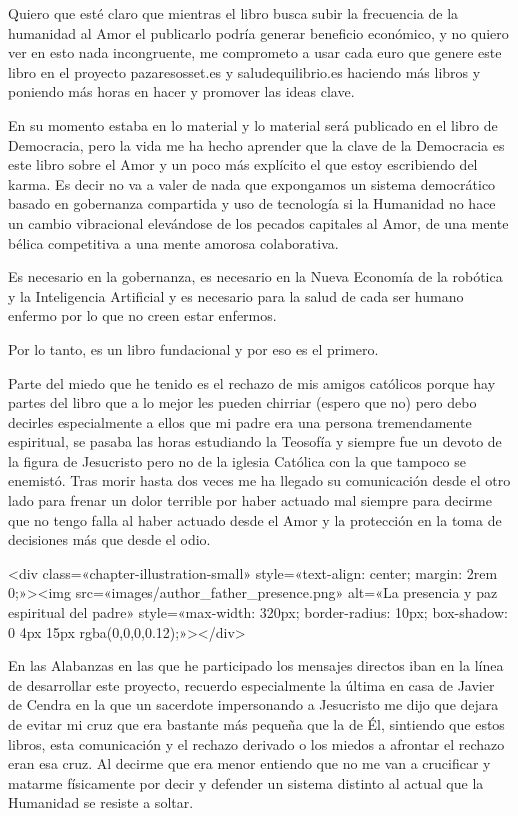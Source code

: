 \documentclass[12pt,twoside,openany]{book}
\begin{document}
Quiero que esté claro que mientras el libro busca subir la frecuencia de la humanidad al Amor el publicarlo podría generar beneficio económico, y no quiero ver en esto nada incongruente, me comprometo a usar cada euro que genere este libro en el proyecto pazaresosset.es y saludequilibrio.es haciendo más libros y poniendo más horas en hacer y promover las ideas clave.

En su momento estaba en lo material y lo material será publicado en el libro de Democracia, pero la vida me ha hecho aprender que la clave de la Democracia es este libro sobre el Amor y un poco más explícito el que estoy escribiendo del karma. Es decir no va a valer de nada que expongamos un sistema democrático basado en gobernanza compartida y uso de tecnología si la Humanidad no hace un cambio vibracional elevándose de los pecados capitales al Amor, de una mente bélica competitiva a una mente amorosa colaborativa.

Es necesario en la gobernanza, es necesario en la Nueva Economía de la robótica y la Inteligencia Artificial y es necesario para la salud de cada ser humano enfermo por lo que no creen estar enfermos.

Por lo tanto, es un libro fundacional y por eso es el primero.

Parte del miedo que he tenido es el rechazo de mis amigos católicos porque hay partes del libro que a lo mejor les pueden chirriar (espero que no) pero debo decirles especialmente a ellos que mi padre era una persona tremendamente espiritual, se pasaba las horas estudiando la Teosofía y siempre fue un devoto de la figura de Jesucristo pero no de la iglesia Católica con la que tampoco se enemistó. Tras morir hasta dos veces me ha llegado su comunicación desde el otro lado para frenar un dolor terrible por haber actuado mal siempre para decirme que no tengo falla al haber actuado desde el Amor y la protección en la toma de decisiones más que desde el odio. 

<div class=«chapter-illustration-small» style=«text-align: center; margin: 2rem 0;»><img src=«images/author_father_presence.png» alt=«La presencia y paz espiritual del padre» style=«max-width: 320px; border-radius: 10px; box-shadow: 0 4px 15px rgba(0,0,0,0.12);»></div>

En las Alabanzas en las que he participado los mensajes directos iban en la línea de desarrollar este proyecto, recuerdo especialmente la última en casa de Javier de Cendra en la que un sacerdote impersonando a Jesucristo me dijo que dejara de evitar mi cruz que era bastante más pequeña que la de Él, sintiendo que estos libros, esta comunicación y el rechazo derivado o los miedos a afrontar el rechazo eran esa cruz. Al decirme que era menor entiendo que no me van a crucificar y matarme físicamente por decir y defender un sistema distinto al actual que la Humanidad se resiste a soltar.
\end{document}
